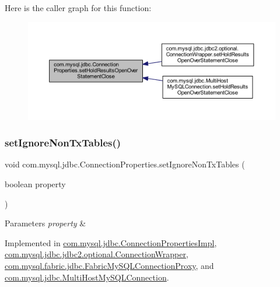 Here is the caller graph for this function\+:\nopagebreak
\begin{figure}[H]
\begin{center}
\leavevmode
\includegraphics[width=350pt]{interfacecom_1_1mysql_1_1jdbc_1_1_connection_properties_a9447a03edd2efdd020960e0a12d22aa7_icgraph}
\end{center}
\end{figure}
\mbox{\label{interfacecom_1_1mysql_1_1jdbc_1_1_connection_properties_aef7c4c2447c9875392d6dff3452d9ac2}} 
\subsubsection{\texorpdfstring{set\+Ignore\+Non\+Tx\+Tables()}{setIgnoreNonTxTables()}}
{\footnotesize\ttfamily void com.\+mysql.\+jdbc.\+Connection\+Properties.\+set\+Ignore\+Non\+Tx\+Tables (\begin{DoxyParamCaption}\item[{boolean}]{property }\end{DoxyParamCaption})}


\begin{DoxyParams}{Parameters}
{\em property} & \\
\hline
\end{DoxyParams}


Implemented in \mbox{\hyperlink{classcom_1_1mysql_1_1jdbc_1_1_connection_properties_impl_a09f67907a067022f4a415a77ea6872b0}{com.\+mysql.\+jdbc.\+Connection\+Properties\+Impl}}, \mbox{\hyperlink{classcom_1_1mysql_1_1jdbc_1_1jdbc2_1_1optional_1_1_connection_wrapper_a67f86e88b0cdc508024a59978cc255af}{com.\+mysql.\+jdbc.\+jdbc2.\+optional.\+Connection\+Wrapper}}, \mbox{\hyperlink{classcom_1_1mysql_1_1fabric_1_1jdbc_1_1_fabric_my_s_q_l_connection_proxy_a1f2221f875d21100cb45c5ce36a044a3}{com.\+mysql.\+fabric.\+jdbc.\+Fabric\+My\+S\+Q\+L\+Connection\+Proxy}}, and \mbox{\hyperlink{classcom_1_1mysql_1_1jdbc_1_1_multi_host_my_s_q_l_connection_a027ef854c24322fe98bd80b458cb82d0}{com.\+mysql.\+jdbc.\+Multi\+Host\+My\+S\+Q\+L\+Connection}}.

